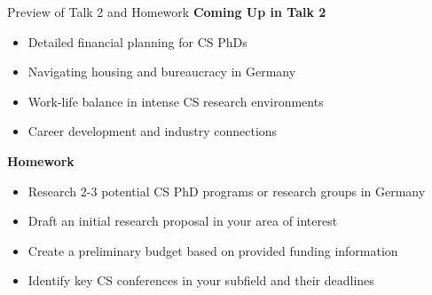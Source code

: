 \documentclass[aspectratio=169,10pt]{beamer}
\begin{document}
\begin{frame}{Preview of Talk 2 and Homework}
    \textbf{Coming Up in Talk 2}
    \begin{itemize}
        \item Detailed financial planning for CS PhDs
        \item Navigating housing and bureaucracy in Germany
        \item Work-life balance in intense CS research environments
        \item Career development and industry connections
    \end{itemize}
    
    \textbf{Homework}
    \begin{itemize}
        \item Research 2-3 potential CS PhD programs or research groups in Germany
        \item Draft an initial research proposal in your area of interest
        \item Create a preliminary budget based on provided funding information
        \item Identify key CS conferences in your subfield and their deadlines
    \end{itemize}
\end{frame}
\end{document}
